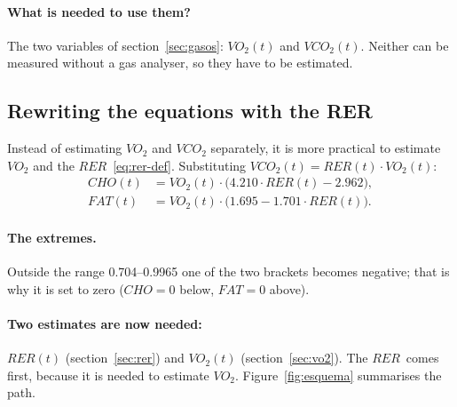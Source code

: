 \documentclass[10pt,a4paper]{article}
\newcommand{\cho}{\ensuremath{\mathit{CHO}}}               %
\newcommand{\fat}{\ensuremath{\mathit{FAT}}}
\newcommand{\VO}{\ensuremath{\mathit{VO}_2}}               %
\newcommand{\VCO}{\ensuremath{\mathit{VCO}_2}}
\newcommand{\RER}{\ensuremath{\mathit{RER}}}
\begin{document}
\paragraph{What is needed to use them?} The two variables of section~\ref{sec:gasos}:
$\VO(t)$ and $\VCO(t)$. Neither can be measured without a gas analyser, so they have to be
estimated.

\subsection{Rewriting the equations with the RER}\label{sec:jw-rer}
Instead of estimating $\VO$ and $\VCO$ separately, it is more practical to estimate $\VO$
and the \RER~\eqref{eq:rer-def}. Substituting $\VCO(t)=\RER(t)\cdot\VO(t)$:
\begin{align}
  \cho(t) &= \VO(t)\cdot\bigl(4.210\cdot\RER(t)-2.962\bigr), \label{eq:jw-cho-rer}\\
  \fat(t) &= \VO(t)\cdot\bigl(1.695-1.701\cdot\RER(t)\bigr). \label{eq:jw-fat-rer}
\end{align}

\paragraph{The extremes.} Outside the range 0.704--0.9965 one of the two brackets becomes
negative; that is why it is set to zero ($\cho=0$ below, $\fat=0$ above).

\needspace{12cm}
\paragraph{Two estimates are now needed:} $\RER(t)$ (section~\ref{sec:rer}) and $\VO(t)$
(section~\ref{sec:vo2}). The \RER\ comes first, because it is needed to estimate $\VO$.
Figure~\ref{fig:esquema} summarises the path.
\end{document}
